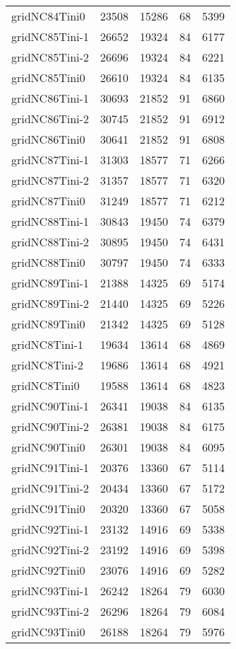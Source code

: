 \begin{tabular}{lrrrr}
gridNC84Tini0 & 23508 & 15286 & 68 & 5399 \\
gridNC85Tini-1 & 26652 & 19324 & 84 & 6177 \\
gridNC85Tini-2 & 26696 & 19324 & 84 & 6221 \\
gridNC85Tini0 & 26610 & 19324 & 84 & 6135 \\
gridNC86Tini-1 & 30693 & 21852 & 91 & 6860 \\
gridNC86Tini-2 & 30745 & 21852 & 91 & 6912 \\
gridNC86Tini0 & 30641 & 21852 & 91 & 6808 \\
gridNC87Tini-1 & 31303 & 18577 & 71 & 6266 \\
gridNC87Tini-2 & 31357 & 18577 & 71 & 6320 \\
gridNC87Tini0 & 31249 & 18577 & 71 & 6212 \\
gridNC88Tini-1 & 30843 & 19450 & 74 & 6379 \\
gridNC88Tini-2 & 30895 & 19450 & 74 & 6431 \\
gridNC88Tini0 & 30797 & 19450 & 74 & 6333 \\
gridNC89Tini-1 & 21388 & 14325 & 69 & 5174 \\
gridNC89Tini-2 & 21440 & 14325 & 69 & 5226 \\
gridNC89Tini0 & 21342 & 14325 & 69 & 5128 \\
gridNC8Tini-1 & 19634 & 13614 & 68 & 4869 \\
gridNC8Tini-2 & 19686 & 13614 & 68 & 4921 \\
gridNC8Tini0 & 19588 & 13614 & 68 & 4823 \\
gridNC90Tini-1 & 26341 & 19038 & 84 & 6135 \\
gridNC90Tini-2 & 26381 & 19038 & 84 & 6175 \\
gridNC90Tini0 & 26301 & 19038 & 84 & 6095 \\
gridNC91Tini-1 & 20376 & 13360 & 67 & 5114 \\
gridNC91Tini-2 & 20434 & 13360 & 67 & 5172 \\
gridNC91Tini0 & 20320 & 13360 & 67 & 5058 \\
gridNC92Tini-1 & 23132 & 14916 & 69 & 5338 \\
gridNC92Tini-2 & 23192 & 14916 & 69 & 5398 \\
gridNC92Tini0 & 23076 & 14916 & 69 & 5282 \\
gridNC93Tini-1 & 26242 & 18264 & 79 & 6030 \\
gridNC93Tini-2 & 26296 & 18264 & 79 & 6084 \\
gridNC93Tini0 & 26188 & 18264 & 79 & 5976 \\

\end{tabular}
